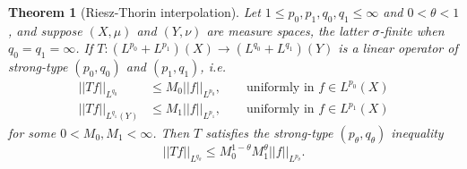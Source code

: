 \documentclass[reqno]{amsart}
\newtheorem{theorem}{Theorem}
\theoremstyle{definition}
\theoremstyle{remark}
\begin{document}
\begin{theorem}[Riesz-Thorin interpolation]
	Let $1 \leq p_0, p_1, q_0, q_1 \leq \infty$ and $0 < \theta < 1$, and suppose $(X, \mu)$ and $(Y, \nu)$ are measure spaces, the latter $\sigma$-finite when $q_0 = q_1 = \infty$. If $T: (L^{p_0} + L^{p_1})(X) \to (L^{q_0} + L^{q_1}) (Y)$ is a linear operator of strong-type $(p_0, q_0)$ and $(p_1, q_1)$, i.e.
		\begin{align*}
			||Tf||_{L^{q_0}} 
				&\leq M_0 ||f||_{L^{p_0}}, \qquad \text{uniformly in $f \in L^{p_0} (X)$} \\
			||Tf||_{L^{q_1} (Y)} 
				&\leq M_1 ||f||_{L^{p_1}}, \qquad \text{uniformly in $f \in L^{p_1} (X)$}
		\end{align*}	
	for some $0 < M_0, M_1 < \infty$. Then $T$ satisfies the strong-type $(p_\theta, q_\theta)$ inequality
		\[ ||Tf||_{L^{q_\theta}} \leq M_0^{1 - \theta} M_1^\theta ||f||_{L^{p_\theta}}. \]
\end{theorem}
\end{document}
